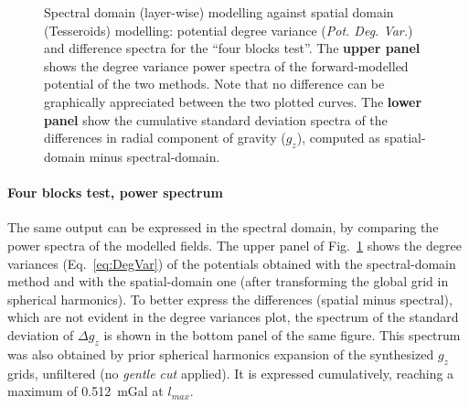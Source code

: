 \begin{subappendices}
\begin{figure} %
    \begin{adjustbox}{center}
    \end{adjustbox}
    \caption[Spectral domain modelling against spatial domain modelling: degree variance and difference spectra (four blocks test).]{
        Spectral domain (layer-wise) modelling against spatial domain (Tesseroids) modelling: potential degree variance (\textit{Pot. Deg. Var.}) and difference spectra for the ``four blocks test''.
        The \textbf{upper panel} shows the degree variance power spectra of the forward-modelled potential of the two methods.
        Note that no difference can be graphically appreciated between the two plotted curves.
        The \textbf{lower panel} show the cumulative standard deviation spectra of the differences in radial component of gravity ($g_z$), computed as spatial-domain minus spectral-domain.}
    \label{fig:SpatSpecComp:4B_dv_spec_tess}
\end{figure}

\paragraph*{Four blocks test, power spectrum}
The same output can be expressed in the spectral domain, by comparing the power spectra of the modelled fields. The upper panel of Fig.~\ref{fig:SpatSpecComp:4B_dv_spec_tess} shows the degree variances (Eq.~\ref{eq:DegVar}) of the potentials obtained with the spectral-domain method and with the spatial-domain one (after transforming the global grid in spherical harmonics).
To better express the differences (spatial minus spectral), which are not evident in the degree variances plot, the spectrum of the standard deviation of $\Delta g_z$ is shown in the bottom panel of the same figure.
This spectrum was also obtained by prior spherical harmonics expansion of the synthesized $g_z$ grids, unfiltered (no \textit{gentle cut} applied).
It is expressed cumulatively, reaching a maximum of \SI{0.512}{\milli Gal} at $l_{max}$.


\end{subappendices}
